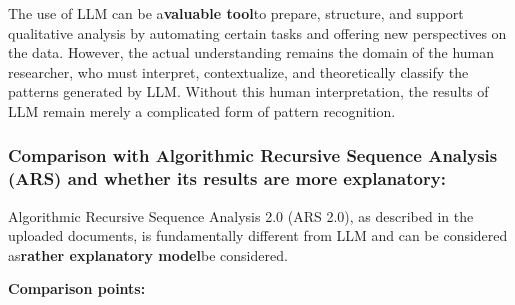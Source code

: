 \documentclass[
]{article}
\begin{document}
The use of LLM can be a\textbf{valuable tool}to prepare, structure, and
support qualitative analysis by automating certain tasks and offering
new perspectives on the data. However, the actual understanding remains
the domain of the human researcher, who must interpret, contextualize,
and theoretically classify the patterns generated by LLM. Without this
human interpretation, the results of LLM remain merely a complicated
form of pattern recognition.

\subsubsection{\texorpdfstring{\textbf{Comparison with Algorithmic
Recursive Sequence Analysis (ARS) and whether its results are more
explanatory:}}{Comparison with Algorithmic Recursive Sequence Analysis (ARS) and whether its results are more explanatory:}}\label{comparison-with-algorithmic-recursive-sequence-analysis-ars-and-whether-its-results-are-more-explanatory}

Algorithmic Recursive Sequence Analysis 2.0 (ARS 2.0), as described in
the uploaded documents, is fundamentally different from LLM and can be
considered as\textbf{rather explanatory model}be considered.

\textbf{Comparison points:}
\end{document}
